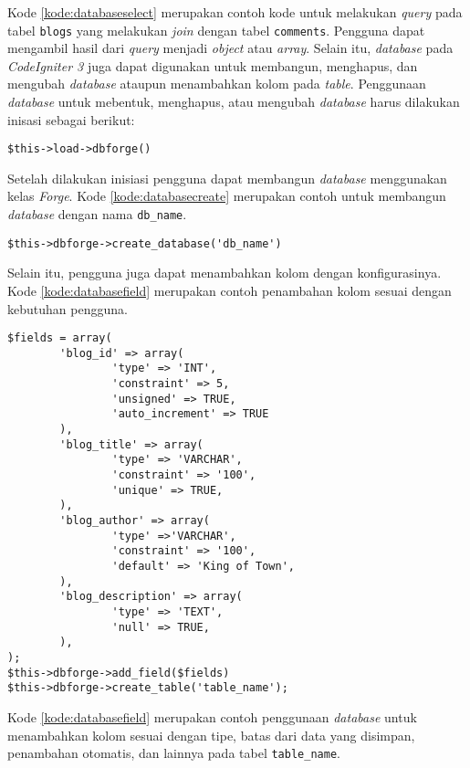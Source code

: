 Kode \ref{kode:databaseselect} merupakan contoh kode untuk melakukan \textit{query} pada tabel \texttt{blogs} yang melakukan \textit{join} dengan tabel \texttt{comments}. Pengguna dapat mengambil hasil dari \textit{query} menjadi \textit{object} atau \textit{array}. Selain itu, \textit{database} pada \textit{CodeIgniter 3} juga dapat digunakan untuk membangun, menghapus, dan mengubah \textit{database} ataupun menambahkan kolom pada \textit{table}. Penggunaan \textit{database} untuk mebentuk, menghapus, atau mengubah \textit{database} harus dilakukan inisasi sebagai berikut:
\begin{center}
\verb|$this->load->dbforge()|
\end{center}
Setelah dilakukan inisiasi pengguna dapat membangun \textit{database} menggunakan kelas \textit{Forge}. Kode \ref{kode:databasecreate} merupakan contoh untuk membangun \textit{database} dengan nama \texttt{db\_name}.

\begin{lstlisting}[caption=Contoh membangun \textit{database} menggunakan \textit{CodeIgniter3} , label=kode:databasecreate]
	$this->dbforge->create_database('db_name')
\end{lstlisting}

Selain itu, pengguna juga dapat menambahkan kolom dengan konfigurasinya. Kode \ref{kode:databasefield} merupakan contoh penambahan kolom sesuai dengan kebutuhan pengguna.

\begin{lstlisting}[caption=Contoh menambahkan kolom dengan konfigurasinya menggunakan \textit{CodeIgniter3} , label=kode:databasefield]
	$fields = array(
        'blog_id' => array(
                'type' => 'INT',
                'constraint' => 5,
                'unsigned' => TRUE,
                'auto_increment' => TRUE
        ),
        'blog_title' => array(
                'type' => 'VARCHAR',
                'constraint' => '100',
                'unique' => TRUE,
        ),
        'blog_author' => array(
                'type' =>'VARCHAR',
                'constraint' => '100',
                'default' => 'King of Town',
        ),
        'blog_description' => array(
                'type' => 'TEXT',
                'null' => TRUE,
        ),
);
$this->dbforge->add_field($fields)
$this->dbforge->create_table('table_name');
\end{lstlisting}
Kode \ref{kode:databasefield} merupakan contoh penggunaan \textit{database} untuk menambahkan kolom sesuai dengan tipe, batas dari data yang disimpan, penambahan otomatis, dan lainnya pada tabel \texttt{table\_name}.

